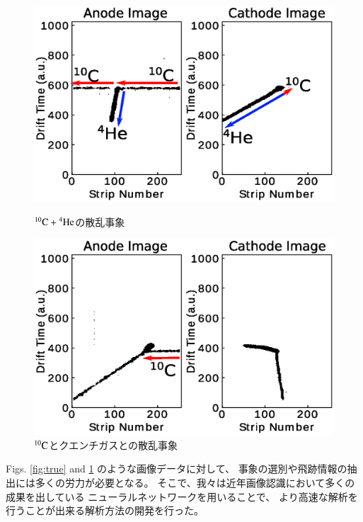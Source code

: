 \documentclass{jps-cp}
\begin{document}
\begin{figure}
  \centering
  \begin{minipage}{0.4\columnwidth}
    \centering
    \includegraphics[clip, width=0.9\columnwidth]{eps/true.eps}
    \caption{${}^{10}\rm{C}+{}^{4}\rm{He}$の散乱事象}
    \label{fig:true}
  \end{minipage}
  \begin{minipage}{0.4\columnwidth}
    \centering
    \includegraphics[clip, width=0.9\columnwidth]{eps/false.eps}
    \caption{${}^{10}\rm{C}$とクエンチガスとの散乱事象}
    \label{fig:false}
  \end{minipage}
\end{figure}

Figs. \ref{fig:true} and \ref{fig:false} のような画像データに対して、
事象の選別や飛跡情報の抽出には多くの労力が必要となる。
そこで、我々は近年画像認識において多くの成果を出している
ニューラルネットワークを用いることで、
より高速な解析を行うことが出来る解析方法の開発を行った。
\end{document}
